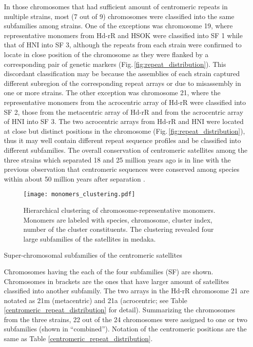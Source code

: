   In those chromosomes that had sufficient amount of centromeric repeats in multiple strains, most (7 out of 9) chromosomes were classified into the same subfamilies among strains. One of the exceptions was chromosome 19, where representative monomers from Hd-rR and HSOK were classified into SF 1 while that of HNI into SF 3, although the repeats from each strain were confirmed to locate in close position of the chromosome as they were flanked by a corresponding pair of genetic markers (Fig.\,\ref{fig:repeat_distribution}). This discordant classification may be because the assemblies of each strain captured different subregion of the corresponding repeat arrays or due to misassembly in one or more strains. The other exception was chromosome 21, where the representative monomers from the acrocentric array of Hd-rR were classified into SF 2, those from the metacentric array of Hd-rR and from the acrocentric array of HNI into SF 3. The two acrocentric arrays from Hd-rR and HNI were located at close but distinct positions in the chromosome (Fig.\,\ref{fig:repeat_distribution}), thus it may well contain different repeat sequence profiles and be classified into different subfamilies. The overall conservation of centromeric satellites among the three strains which separated 18 and 25 million years ago is in line with the previous observation that centromeric sequences were conserved among species within about 50 million years after separation \cite{Melters2013}.

  \begin{figure*}
    \centering
    \texttt{[image: monomers\_clustering.pdf]}
    \caption{
      Hierarchical clustering of chromosome-representative monomers. Monomers are labeled with species, chromosome, cluster index, number of the cluster constituents. The clustering revealed four large subfamilies of the satellites in medaka.
    }
    \label{monomer_clustering}
  \end{figure*}

  \begin{table*}
    \centering
    \caption{Super-chromosomal subfamilies of the centromeric satellites}
    
    \label{super_chromosomal_subfamily}
    \caption*{{\small
      Chromosomes having the each of the four subfamilies (SF) are shown. Chromosomes in brackets are the ones that have larger amount of satellites classified into another subfamily. The two arrays in the Hd-rR chromosome 21 are notated as 21m (metacentric) and 21a (acrocentric; see Table \ref{centromeric_repeat_distribution} for detail). Summarizing the chromosomes from the three strains, 22 out of the 24 chromosomes were assigned to one or two subfamilies (shown in ``combined''). Notation of the centromeric positions are the same as Table \ref{centromeric_repeat_distribution}.
    }}
  \end{table*}



